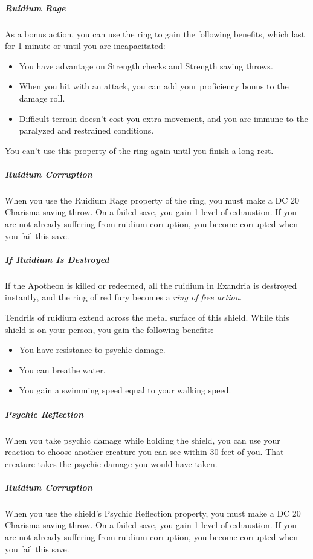 \documentclass[10pt,a4paper,twoside,fancy,bg=print,twocolumn,openany,nodeprecatedcode]{dndbook}
\begin{document}
\subparagraph{Ruidium Rage}
As a bonus action, you can use the ring to gain the following benefits, which last for 1 minute or until you are incapacitated:


\begin{itemize}
\item You have advantage on Strength checks and Strength saving throws.
\item When you hit with an attack, you can add your proficiency bonus to the damage roll.
\item Difficult terrain doesn't cost you extra movement, and you are immune to the paralyzed and restrained conditions.
\end{itemize}

You can't use this property of the ring again until you finish a long rest.

\subparagraph{Ruidium Corruption}
When you use the Ruidium Rage property of the ring, you must make a DC 20 Charisma saving throw. On a failed save, you gain 1 level of exhaustion. If you are not already suffering from ruidium corruption, you become corrupted when you fail this save.

\subparagraph{If Ruidium Is Destroyed}
If the Apotheon is killed or redeemed, all the ruidium in Exandria is destroyed instantly, and the ring of red fury becomes a \textit{ring of free action}.

Tendrils of ruidium extend across the metal surface of this shield. While this shield is on your person, you gain the following benefits:


\begin{itemize}
\item You have resistance to psychic damage.
\item You can breathe water.
\item You gain a swimming speed equal to your walking speed.
\end{itemize}

\subparagraph{Psychic Reflection}
When you take psychic damage while holding the shield, you can use your reaction to choose another creature you can see within 30 feet of you. That creature takes the psychic damage you would have taken.

\subparagraph{Ruidium Corruption}
When you use the shield's Psychic Reflection property, you must make a DC 20 Charisma saving throw. On a failed save, you gain 1 level of exhaustion. If you are not already suffering from ruidium corruption, you become corrupted when you fail this save.
\end{document}
